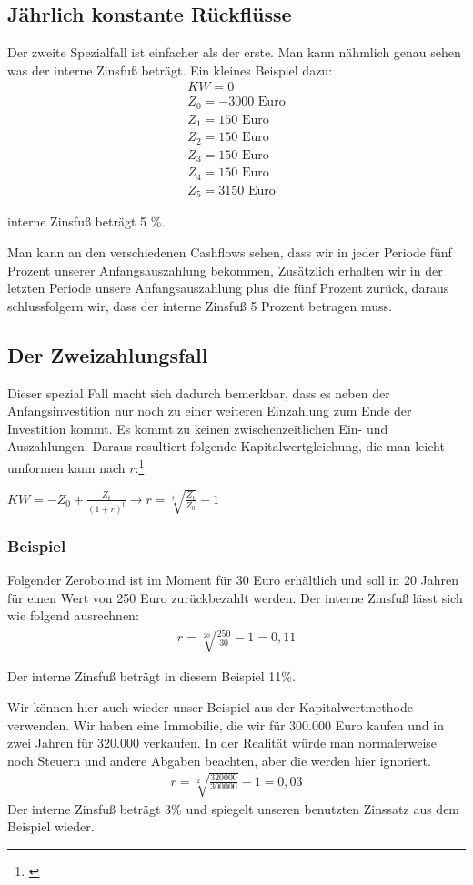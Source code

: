 \subsection{Jährlich konstante Rückflüsse}
Der zweite Spezialfall ist einfacher als der erste. Man kann nähmlich genau sehen was der interne Zinsfuß beträgt. Ein kleines Beispiel dazu:
\begin{align*}
    KW = 0                   \\
    Z_0 = -3000 \text{ Euro} \\
    Z_1 = 150 \text{ Euro}   \\
    Z_2 = 150 \text{ Euro}   \\
    Z_3 = 150 \text{ Euro}   \\
    Z_4 = 150 \text{ Euro}   \\
    Z_5 = 3150 \text{ Euro}
\end{align*}
\begin{center}
    interne Zinsfuß beträgt 5 \%.
\end{center}
Man kann an den verschiedenen Cashflows sehen, dass wir in jeder Periode fünf Prozent unserer Anfangsauszahlung bekommen, Zusätzlich erhalten wir in der letzten Periode unsere Anfangsauszahlung plus die fünf Prozent zurück, daraus schlussfolgern wir, dass der interne Zinsfuß 5 Prozent betragen muss.
\subsection{Der Zweizahlungsfall}
Dieser spezial Fall macht sich dadurch bemerkbar, dass es neben der Anfangsinvestition nur noch zu einer weiteren Einzahlung zum Ende der Investition kommt. Es kommt zu keinen zwischenzeitlichen Ein- und Auszahlungen. Daraus resultiert folgende Kapitalwertgleichung, die man leicht umformen kann nach $r$:\footnote{\cite{lex-interner-zinsfuss}}\\
\begin{center}
    $ KW = -Z_{0} + \frac{Z_{t}}{(1+r)^{t}} \rightarrow r = \sqrt[t]{\frac{Z_t}{Z_0}} - 1 $
\end{center}
\newpage
\subsubsection{Beispiel}
Folgender Zerobound ist im Moment für 30 Euro erhältlich und soll in 20 Jahren für einen Wert von 250 Euro zurückbezahlt werden. Der interne Zinsfuß lässt sich wie folgend ausrechnen:
\begin{align*}
    r = \sqrt[20]{\frac{250}{30}} -1 = 0,11
\end{align*}
\begin{center}
    Der interne Zinsfuß beträgt in diesem Beispiel 11\%.
\end{center}
Wir können hier auch wieder unser Beispiel aus der Kapitalwertmethode verwenden. Wir haben eine Immobilie, die wir für 300.000 Euro kaufen und in zwei Jahren für 320.000 verkaufen. In der Realität würde man normalerweise noch Steuern und andere Abgaben beachten, aber die werden hier ignoriert.
\begin{align*}
    r = \sqrt[2]{\frac{320000}{300000}} -1 = 0,03
\end{align*}
Der interne Zinsfuß beträgt 3\% und spiegelt unseren benutzten Zinssatz aus dem Beispiel wieder.
